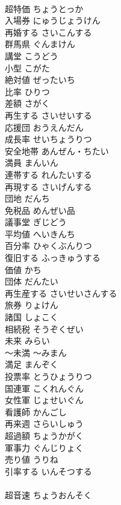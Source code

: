 \documentclass[8pt]{extreport}
\begin{document}
\begin{CJK}{UTF8}{min}
\\	超特価	ちょうとっか	
\\	入場券	にゅうじょうけん	
\\	再婚する	さいこんする	
\\	群馬県	ぐんまけん	
\\	講堂	こうどう	
\\	小型	こがた	
\\	絶対値	ぜったいち	
\\	比率	ひりつ	
\\	差額	さがく	
\\	再生する	さいせいする	
\\	応援団	おうえんだん	
\\	成長率	せいちょうりつ	
\\	安全地帯	あんぜん・ちたい	
\\	満員	まんいん	
\\	連帯する	れんたいする	
\\	再現する	さいげんする	
\\	団地	だんち	
\\	免税品	めんぜい品	
\\	議事堂	ぎじどう	
\\	平均値	へいきんち	
\\	百分率	ひゃくぶんりつ	
\\	復旧する	ふっきゅうする	
\\	価値	かち	
\\	団体	だんたい	
\\	再生産する	さいせいさんする	
\\	旅券	りょけん	
\\	諸国	しょこく	
\\	相続税	そうぞくぜい	
\\	未来	みらい	
\\	～未満	～みまん	
\\	満足	まんぞく	
\\	投票率	とうひょうりつ	
\\	国連軍	こくれんぐん	
\\	女性軍	じょせいぐん	
\\	看護師	かんごし	
\\	再来週	さらいしゅう	
\\	超過額	ちょうかがく	
\\	軍事力	ぐんじりょく	
\\	売り値	うりね	
\\	引率する	いんそつする	
\\	[漢語]
\\	超音速	ちょうおんそく	

\end{CJK}
\end{document}
